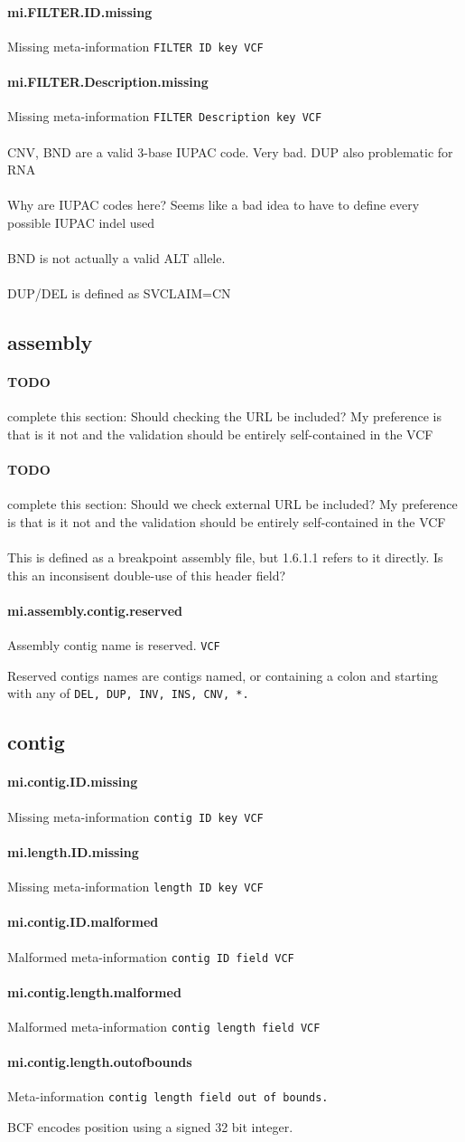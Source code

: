 \documentclass[10pt]{article}
\newcommand{\vcfstrictrule}[5]{
	\paragraph{#1} #2 #4	
	#5
	\par
}
\newcommand{\vcfspec}{\tt VCF}
\newcommand{\SPECISSUE}[1]{\paragraph{} #1}
\newcommand{\TODO}[1]{\paragraph{TODO} complete this section: #1}
\newcommand{\structuredheadermissingfield}[2] {
	\vcfstrictrule{mi.#1.#2.missing}{Missing meta-information \tt{#1} \tt{#2} key}{Missing \tt{#1} field for \tt{#2} meta-information line.}{\vcfspec}{}
}
\newcommand{\externalfilevalidation}[5] {
	\TODO{Should we check external URL be included? My preference is that is it not and the validation should be entirely self-contained in the VCF}
}
\begin{document}
\structuredheadermissingfield{FILTER}{ID}
\structuredheadermissingfield{FILTER}{Description}

\SPECISSUE{CNV, BND are a valid 3-base IUPAC code. Very bad. DUP also problematic for RNA}
\SPECISSUE{Why are IUPAC codes here? Seems like a bad idea to have to define every possible IUPAC indel used}
\SPECISSUE{BND is not actually a valid ALT allele.}
\SPECISSUE{DUP/DEL is defined as SVCLAIM=CN}

\subsection{assembly}
\TODO{Should checking the URL be included? My preference is that is it not and the validation should be entirely self-contained in the VCF}
\externalfilevalidation{assembly.missingfile}

\SPECISSUE{What happens if there are multiple assembly files specified?}
\SPECISSUE{Why must the assembly file be a fasta file? GRIDSS uses a BAM file for breakpoint assembly contigs.}
\SPECISSUE{This is defined as a breakpoint assembly file, but 1.6.1.1 refers to it directly. Is this an inconsisent double-use of this header field?}

\vcfstrictrule{mi.assembly.contig.reserved}{Assembly contig name is reserved.}{ The assembly file contains a reserved contig name.}{\vcfspec}{
Reserved contigs names are contigs named, or containing a colon and starting with any of \tt{DEL}, \tt{DUP}, \tt{INV}, \tt{INS}, \tt{CNV}, \tt{*}.
}

\subsection{contig}

\structuredheadermissingfield{contig}{ID}
\structuredheadermissingfield{length}{ID} %
\vcfstrictrule{mi.contig.ID.malformed}{Malformed meta-information \tt{contig} \tt{ID} field}{contig ID field does not match the regex \tt{[0-9A-Za-z!\#\$\%\&+./:;?@\^\_|\~-][0-9A-Za-z!\#\$\%\&*+./:;=?@\^\_|\~-]*}.}{\vcfspec}{}
\vcfstrictrule{mi.contig.length.malformed}{Malformed meta-information \tt{contig} \tt{length} field}{contig length field is not an integer.}{\vcfspec}{}
\vcfstrictrule{mi.contig.length.outofbounds}{Meta-information \tt{contig} \tt{length} field out of bounds.}{Out of bounds contig length field. Minimum value is 0. Maximum value is 2,147,483,647 (2^31-1). }{\bcf}{
BCF encodes position using a signed 32 bit integer.
}
\end{document}
